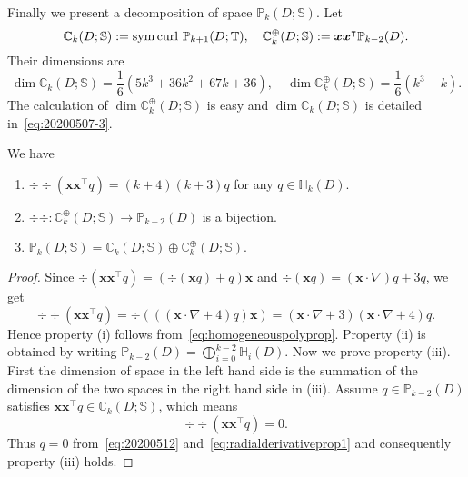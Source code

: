 Finally we present a decomposition of space $\mathbb P_{k}(D; \mathbb S)$.
Let
\[
\mathbb C_k(D; \mathbb S):=\operatorname{sym} \operatorname{curl} \, \mathbb  P_{k+1}(D; \mathbb T),\quad \mathbb C_k^{\oplus}(D; \mathbb S):=\boldsymbol  x\boldsymbol  x^{\intercal}\mathbb P_{k-2}(D).
\]
Their dimensions are
\begin{equation}\label{eq:dimC}
\dim\mathbb C_k(D; \mathbb S)=\frac{1}{6}(5k^3+36k^2+67k+36),\quad \dim\mathbb C_k^{\oplus}(D; \mathbb S)=\frac{1}{6}(k^3-k).
\end{equation}
The calculation of $\dim\mathbb C_k^{\oplus}(D; \mathbb S)$ is easy and $\dim\mathbb C_k(D; \mathbb S)$ is detailed in~\eqref{eq:20200507-3}. 

\begin{lemma}\label{lem:symmpolyspacedirectsum}
We have
\begin{enumerate}[\rm (i)]
\item $\displaystyle \div\div (\boldsymbol x\boldsymbol x^{\intercal} q) = (k+4)(k+3) q$ for any $q\in \mathbb H_k(D).$

\medskip
\item $\div\div: \mathbb C_k^{\oplus}(D; \mathbb S)\to\mathbb P_{k-2}(D)$ is a bijection.

\medskip
 \item
$\displaystyle
\mathbb P_{k}(D; \mathbb S)=\mathbb C_k(D; \mathbb S)\oplus \mathbb C_k^{\oplus}(D; \mathbb S).
$
\end{enumerate}
\end{lemma}
\begin{proof}
Since
$
{\div}(\boldsymbol  x\boldsymbol  x^{\intercal}q)=(\div(\boldsymbol  x q)+q)\boldsymbol  x
$ and $\div(\boldsymbol  x q)=(\boldsymbol x\cdot\nabla)q+3q$,  we get
\begin{equation}\label{eq:20200512}
\div\div (\boldsymbol x\boldsymbol x^{\intercal} q)=\div(((\boldsymbol x\cdot\nabla+4)q)\boldsymbol x)=(\boldsymbol x\cdot\nabla+3)(\boldsymbol x\cdot\nabla+4)q.
\end{equation}
Hence property (i) follows from~\eqref{eq:homogeneouspolyprop}.
Property (ii) is obtained by writing $\mathbb P_{k-2}(D) = \bigoplus_{i=0}^{k-2} \mathbb H_i(D)$.
Now we prove property (iii). 
First the dimension of space in the left hand side is the summation of the dimension of the two spaces in the right hand side in (iii).
Assume $q\in\mathbb P_{k-2}(D)$ satisfies $\boldsymbol x\boldsymbol  x^{\intercal}q\in\mathbb C_k(D; \mathbb S)$, which means
\[
\div{\div}(\boldsymbol  x\boldsymbol  x^{\intercal}q)=0.
\]
Thus $q=0$ from~\eqref{eq:20200512} and~\eqref{eq:radialderivativeprop1} and consequently property (iii) holds.
\end{proof}

